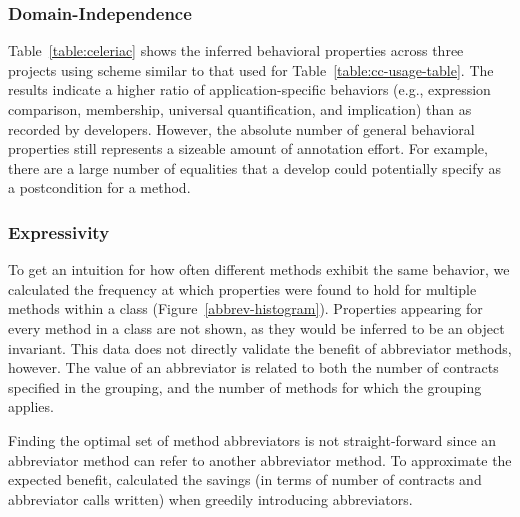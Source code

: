\subsubsection{Domain-Independence}

Table~\ref{table:celeriac} shows the inferred behavioral properties
across three projects using scheme similar to that used for
Table~\ref{table:cc-usage-table}.
%
The results indicate a higher ratio of application-specific behaviors
(e.g., expression comparison, membership, universal quantification,
and implication) than as recorded by developers.
%
However, the absolute number of general behavioral properties still
represents a sizeable amount of annotation effort. For example, there
are a large number of equalities that a develop could potentially
specify as a postcondition for a method.

\begin{table*}
\begin{center}{\small }
  \caption{Behavioral properties dynamically inferred by Daikon; the
    contents of each category are mutually exclusive.  The Mishra
    Reader View Models component and Sando Indexer component are the subjects of the developer case study in
    Section~\ref{sec:observe}.
    }
\end{center}
\label{table:celeriac}
\end{table*}

\subsubsection{Expressivity}
To get an intuition for how often different methods exhibit the same
behavior, we calculated the frequency at which
properties were found to hold for multiple methods within a class
(Figure~\ref{abbrev-histogram}). Properties appearing for every method
in a class are not shown, as they would be inferred to be an object
invariant.
%
This data does not directly validate the benefit of abbreviator
methods, however. The value of an abbreviator is related to both the
number of contracts specified in the grouping, and the number of
methods for which the grouping applies.

Finding the optimal set of method abbreviators is not straight-forward
since an abbreviator method can refer to another abbreviator method.
To approximate the expected benefit, calculated the savings (in terms
of number of contracts and abbreviator calls written) when greedily
introducing abbreviators. 

